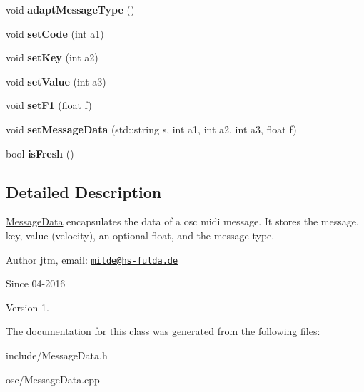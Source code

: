\begin{DoxyCompactItemize}
\item 
\hypertarget{classosc_1_1MessageData_a0f8ce5f6d5c4452e26656236ee7aefc3}{void {\bfseries adapt\-Message\-Type} ()}\label{classosc_1_1MessageData_a0f8ce5f6d5c4452e26656236ee7aefc3}

\item 
\hypertarget{classosc_1_1MessageData_a8639583a844208ccae9568bb68d1e547}{void {\bfseries set\-Code} (int a1)}\label{classosc_1_1MessageData_a8639583a844208ccae9568bb68d1e547}

\item 
\hypertarget{classosc_1_1MessageData_a54a0ddfb44fba671ba243914b037e231}{void {\bfseries set\-Key} (int a2)}\label{classosc_1_1MessageData_a54a0ddfb44fba671ba243914b037e231}

\item 
\hypertarget{classosc_1_1MessageData_a24e273f0a4443505ccf6222405cfb567}{void {\bfseries set\-Value} (int a3)}\label{classosc_1_1MessageData_a24e273f0a4443505ccf6222405cfb567}

\item 
\hypertarget{classosc_1_1MessageData_a94dce06ace95a93c075dbaf253e559fe}{void {\bfseries set\-F1} (float f)}\label{classosc_1_1MessageData_a94dce06ace95a93c075dbaf253e559fe}

\item 
\hypertarget{classosc_1_1MessageData_a9eb7741e4216075b0e03c554d83e35ae}{void {\bfseries set\-Message\-Data} (std\-::string s, int a1, int a2, int a3, float f)}\label{classosc_1_1MessageData_a9eb7741e4216075b0e03c554d83e35ae}

\item 
\hypertarget{classosc_1_1MessageData_a169f4e7ec5a0eb896cfccd8186b5fe8d}{bool {\bfseries is\-Fresh} ()}\label{classosc_1_1MessageData_a169f4e7ec5a0eb896cfccd8186b5fe8d}

\end{DoxyCompactItemize}


\subsection{Detailed Description}
\hyperlink{classosc_1_1MessageData}{Message\-Data} encapsulates the data of a osc midi message. It stores the message, key, value (velocity), an optional float, and the message type.

\begin{DoxyAuthor}{Author}
jtm, email\-:  \href{mailto:milde@hs-fulda.de}{\tt milde@hs-\/fulda.\-de} 
\end{DoxyAuthor}
\begin{DoxySince}{Since}
04-\/2016 
\end{DoxySince}
\begin{DoxyVersion}{Version}
1. 
\end{DoxyVersion}


The documentation for this class was generated from the following files\-:\begin{DoxyCompactItemize}
\item 
include/Message\-Data.\-h\item 
osc/Message\-Data.\-cpp\end{DoxyCompactItemize}
